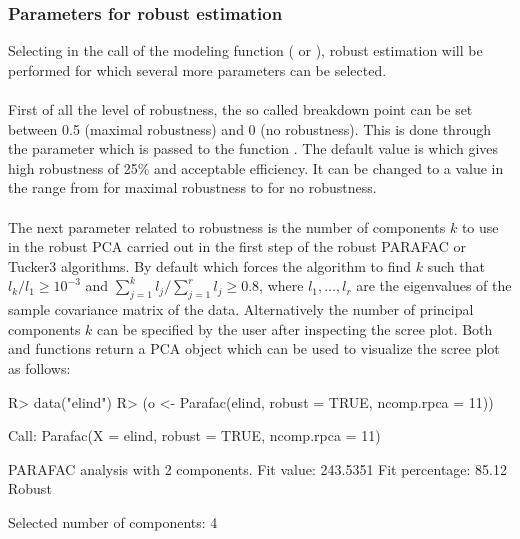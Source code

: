 \documentclass[article,shortnames, nojss]{jss}
\begin{document}
\subsubsection{Parameters for robust estimation}
Selecting  in the call of the modeling
function ( or ), robust
estimation will be performed for which several more
parameters can be selected.\\\\
First of all the level of robustness,
the so called breakdown point can be set between 0.5 (maximal robustness) and 0 (no robustness).
This is done through the parameter  which is passed to the function
. The default value is  which gives
high robustness of 25\% and acceptable efficiency. It can be changed to a value in the range from
 for maximal robustness to  for no robustness.\\\\
The next parameter related to robustness is the number of components $k$ to use in the robust PCA
carried out in the first step of the robust PARAFAC or Tucker3 algorithms. By default
 which forces the algorithm to find $k$ such that $l_k/l_1
\ge 10^{-3}$ and $\sum_{j=1}^k l_j/\sum_{j=1}^r l_j \ge 0.8$, where $l_1, \ldots, l_r$
are the eigenvalues of the sample covariance matrix of the data.
Alternatively the number of principal components $k$ can be
specified by the user after inspecting the scree plot. Both  and
 functions return a PCA object  which can be used to
visualize the scree plot as follows:
\begin{Schunk}
\begin{Sinput}
R> data("elind")
R> (o <- Parafac(elind, robust = TRUE, ncomp.rpca = 11))
\end{Sinput}
\begin{Soutput}
Call:
Parafac(X = elind, robust = TRUE, ncomp.rpca = 11)


PARAFAC analysis with  2  components.
Fit value: 243.5351 
Fit percentage: 85.12 %
Robust
\end{Soutput}
\begin{Soutput}
 Selected number of components:  4 
\end{Soutput}
\end{Schunk}
\end{document}
